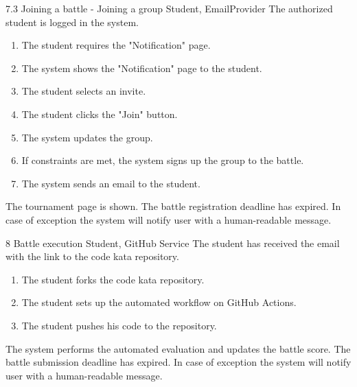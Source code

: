 \clearpage

\usecase
{7.3}
{Joining a battle - Joining a group}
{Student, EmailProvider}
{The authorized student is logged in the system.}
{
    \begin{enumerate}
        \item The student requires the "Notification" page.
        \item The system shows the "Notification" page to the student.
        \item The student selects an invite.
        \item The student clicks the "Join" button.
        \item The system updates the group.
        \item If constraints are met, the system signs up the group to the battle.
        \item The system sends an email to the student.
    \end{enumerate}
}
{The tournament page is shown.}
{
    The battle registration deadline has expired.
}
{
    In case of exception the system will notify user with a human-readable message.
}


\usecase
{8}
{Battle execution}
{Student, GitHub Service}
{The student has received the email with the link to the code kata repository.}
{
    \begin{enumerate}
        \item The student forks the code kata repository.
        \item The student sets up the automated workflow on GitHub Actions.
        \item The student pushes his code to the repository.
    \end{enumerate}
}
{The system performs the automated evaluation and updates the battle score.}
{
    The battle submission deadline has expired.
}
{
    In case of exception the system will notify user with a human-readable message.
}

